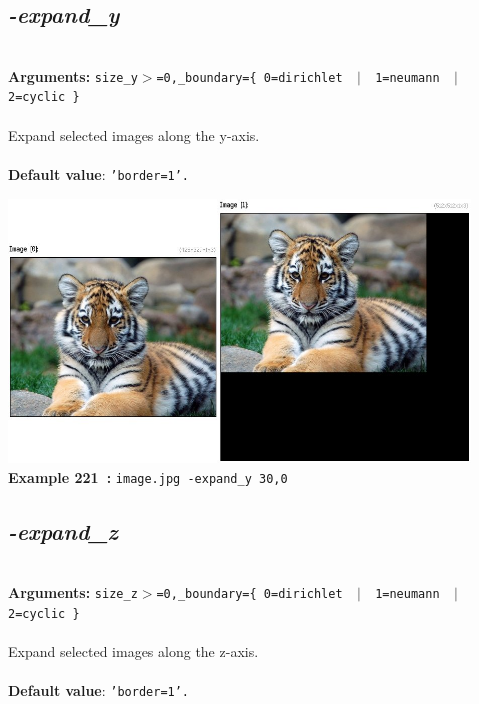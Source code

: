 \documentclass[a4paper,11pt,twoside]{book}
\begin{document}
\subsection{\emph{-expand\_y} }\vspace*{-0.5em}
~\\\textbf{Arguments: } 
{\small \texttt{size\_y$>$=0,\_boundary=\{ 0=dirichlet ~$|$~ 1=neumann ~$|$~ 2=cyclic \}}}\\~\\
Expand selected images along the y-axis.
~\\~\\\textbf{Default value}: {\small \texttt{'border=1'.}}
\begin{center}\includegraphics[keepaspectratio=true,height=7cm,width=\textwidth]{img/gmic_def221.jpg}\\
{\footnotesize \textbf{Example 221~:} \texttt{image.jpg -expand\_y 30,0}}
\end{center}

\subsection{\emph{-expand\_z} }\vspace*{-0.5em}
~\\\textbf{Arguments: } 
{\small \texttt{size\_z$>$=0,\_boundary=\{ 0=dirichlet ~$|$~ 1=neumann ~$|$~ 2=cyclic \}}}\\~\\
Expand selected images along the z-axis.
~\\~\\\textbf{Default value}: {\small \texttt{'border=1'.}}
\end{document}
